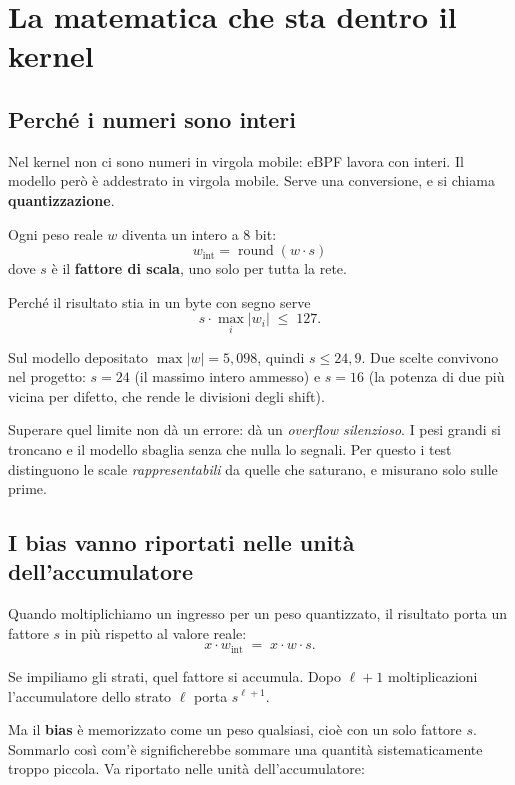 \documentclass[11pt,a4paper,oneside]{report}
\begin{document}
\chapter{La matematica che sta dentro il kernel}

\section{Perché i numeri sono interi}

Nel kernel non ci sono numeri in virgola mobile: eBPF lavora con interi. Il
modello però è addestrato in virgola mobile. Serve una conversione, e si chiama
\textbf{quantizzazione}.

Ogni peso reale $w$ diventa un intero a 8 bit:
\[
  w_{\text{int}} = \operatorname{round}(w \cdot s)
\]
dove $s$ è il \textbf{fattore di scala}, uno solo per tutta la rete.

Perché il risultato stia in un byte con segno serve
\[
  s \cdot \max_i |w_i| \;\le\; 127 .
\]

Sul modello depositato $\max|w| = 5{,}098$, quindi $s \le 24{,}9$. Due scelte
convivono nel progetto: $s = 24$ (il massimo intero ammesso) e $s = 16$ (la
potenza di due più vicina per difetto, che rende le divisioni degli shift).

\begin{lezione}
Superare quel limite non dà un errore: dà un \emph{overflow silenzioso}. I pesi
grandi si troncano e il modello sbaglia senza che nulla lo segnali. Per questo i
test distinguono le scale \emph{rappresentabili} da quelle che saturano, e
misurano solo sulle prime.
\end{lezione}

\section{I bias vanno riportati nelle unità dell'accumulatore}

Quando moltiplichiamo un ingresso per un peso quantizzato, il risultato porta
un fattore $s$ in più rispetto al valore reale:
\[
  x \cdot w_{\text{int}} \;=\; x \cdot w \cdot s .
\]

Se impiliamo gli strati, quel fattore si accumula. Dopo $\ell+1$ moltiplicazioni
l'accumulatore dello strato $\ell$ porta $s^{\ell+1}$.

Ma il \textbf{bias} è memorizzato come un peso qualsiasi, cioè con un solo
fattore $s$. Sommarlo così com'è significherebbe sommare una quantità
sistematicamente troppo piccola. Va riportato nelle unità dell'accumulatore:
\end{document}

